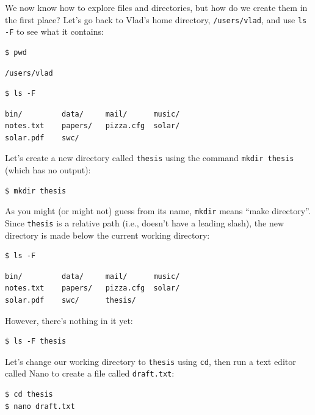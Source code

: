 \documentclass{book}
\begin{document}
We now know how to explore files and directories, but how do we create
them in the first place? Let's go back to Vlad's home directory,
\texttt{/users/vlad}, and use \texttt{ls -F} to see what it contains:

\begin{verbatim}
$ pwd
\end{verbatim}

\begin{verbatim}
/users/vlad
\end{verbatim}

\begin{verbatim}
$ ls -F
\end{verbatim}

\begin{verbatim}
bin/         data/     mail/      music/
notes.txt    papers/   pizza.cfg  solar/
solar.pdf    swc/
\end{verbatim}

Let's create a new directory called \texttt{thesis} using the command
\texttt{mkdir thesis} (which has no output):

\begin{verbatim}
$ mkdir thesis
\end{verbatim}

As you might (or might not) guess from its name, \texttt{mkdir} means
``make directory''. Since \texttt{thesis} is a relative path (i.e.,
doesn't have a leading slash), the new directory is made below the
current working directory:

\begin{verbatim}
$ ls -F
\end{verbatim}

\begin{verbatim}
bin/         data/     mail/      music/
notes.txt    papers/   pizza.cfg  solar/
solar.pdf    swc/      thesis/
\end{verbatim}

However, there's nothing in it yet:

\begin{verbatim}
$ ls -F thesis
\end{verbatim}

Let's change our working directory to \texttt{thesis} using \texttt{cd},
then run a text editor called Nano to create a file called
\texttt{draft.txt}:

\begin{verbatim}
$ cd thesis
$ nano draft.txt
\end{verbatim}
\end{document}
